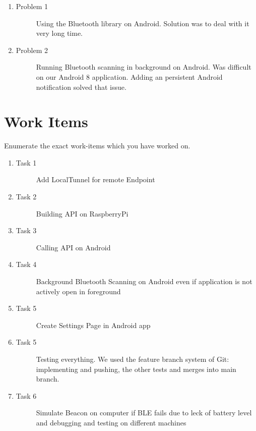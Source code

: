 \documentclass[
10pt, %
a4paper, %
oneside, %
headinclude,footinclude, %
BCOR5mm, %
]{scrartcl}
\begin{document}
\begin{enumerate}
\item 
	\begin{description}
	\item[Problem 1] Using the Bluetooth library on Android. Solution was to deal with it very long time.
	\end{description}
	\item 
	\begin{description}
	\item[Problem 2] Running Bluetooth scanning in background on Android. Was difficult on our Android 8 application. Adding an persistent Android notification solved that issue.
	\end{description}
\end{enumerate}

\section{Work Items}
Enumerate the exact work-items which you have worked on. 
\begin{enumerate}
\item 
	\begin{description}
	\item[Task 1] Add LocalTunnel for remote Endpoint
	\end{description}
	\item 
	\begin{description}
		\item[Task 2] Building API on RaspberryPi
	\end{description}
	\item 
	\begin{description}
		\item[Task 3] Calling API on Android
	\end{description}
	\item 
	\begin{description}
		\item[Task 4] Background Bluetooth Scanning on Android even if application is not actively open in foreground
	\end{description}
	\item 
	\begin{description}
		\item[Task 5] Create Settings Page in Android app
	\end{description}
	\item 
	\begin{description}
		\item[Task 5] Testing everything. We used the feature branch system of Git: implementing and pushing, the other tests and merges into main branch.
	\end{description}
	\item 
	\begin{description}
		\item[Task 6] Simulate Beacon on computer if BLE fails due to leck of battery level and debugging and testing on different machines
	\end{description}
\end{enumerate}
\end{document}
